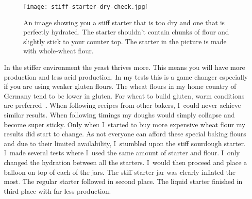 \begin{figure}[!htb]
  \texttt{[image: stiff-starter-dry-check.jpg]}
  \caption[Too dry and perfectly hydrated stiff starter]{An image showing you a
      stiff starter that is too dry and one that is perfectly hydrated.  The
      starter shouldn't contain chunks of flour and slightly stick to your
      counter top. The starter in the picture is made with whole-wheat flour.}%
  \label{fig:stiff-starter-dry-check}
\end{figure}

\begin{flowchart}[!htb]
\begin{center}
  
  \caption[Converting to a stiff starter]{The process to convert your regular
      starter into a stiff starter. The whole process takes around 3 days. The
      longer you maintain your starter at the suggested hydration level, the
      more adapted your microorganisms become. The stiff starter boosts the
      yeast activity of your sourdough starter.  The guide uses a
      \qty{50}{\percent} hydration level for the starter. If the dough is too
      stiff consider increasing this to \qty{60}{\percent}.}%
  \label{fig:stiff-starter-conversion}
\end{center}
\end{flowchart}

In the stiffer environment the yeast thrives more. This means you will have
more  production and less acid production. In my tests this is a game
changer especially if you are using weaker gluten flours. The wheat flours in
my home country of Germany tend to be lower in gluten. For wheat to build gluten, warm conditions
are preferred~\cite{gluten+development+temperatures}. When following recipes
from other bakers, I~could never achieve similar results. When following
timings my doughs would
simply collapse and become super sticky. Only when I~started to buy more
expensive wheat flour my results did start to change. As not everyone can afford
these special baking flours and due to their limited availability, I~stumbled upon the
stiff sourdough starter. I~made several tests where I~used the same amount of
starter and flour. I~only changed the hydration between all the starters.
I~would then proceed and place a balloon on top of each of the jars. The stiff
starter jar was clearly inflated the most. The regular starter
followed in second place. The liquid starter finished in third place with far less 
production.


